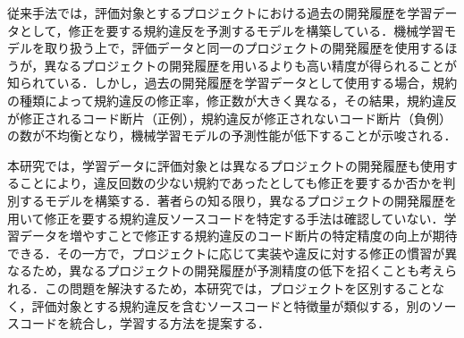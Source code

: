 \documentclass[T,J]{fose} %
\begin{document}


従来手法では，評価対象とするプロジェクトにおける過去の開発履歴を学習データとして，修正を要する規約違反を予測するモデルを構築している．機械学習モデルを取り扱う上で，評価データと同一のプロジェクトの開発履歴を使用するほうが，異なるプロジェクトの開発履歴を用いるよりも高い精度が得られることが知られている．しかし，過去の開発履歴を学習データとして使用する場合，規約の種類によって規約違反の修正率，修正数が大きく異なる\cite{Panichella}，その結果，規約違反が修正されるコード断片（正例），規約違反が修正されないコード断片（負例）の数が不均衡となり，機械学習モデルの予測性能が低下することが示唆される．

本研究では，学習データに評価対象とは異なるプロジェクトの開発履歴も使用することにより，違反回数の少ない規約であったとしても修正を要するか否かを判別するモデルを構築する．著者らの知る限り，異なるプロジェクトの開発履歴を用いて修正を要する規約違反ソースコードを特定する手法は確認していない．学習データを増やすことで修正する規約違反のコード断片の特定精度の向上が期待できる．その一方で，プロジェクトに応じて実装や違反に対する修正の慣習が異なるため，異なるプロジェクトの開発履歴が予測精度の低下を招くことも考えられる．この問題を解決するため，本研究では，プロジェクトを区別することなく，評価対象とする規約違反を含むソースコードと特徴量が類似する，別のソースコードを統合し，学習する方法を提案する．




\end{document}
